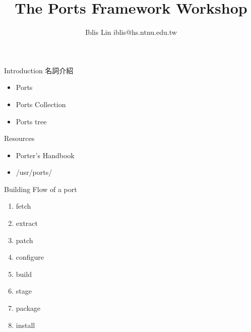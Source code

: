 \documentclass{beamer}
\title{The Ports Framework Workshop}
\author{Iblis Lin \textlangle{}iblis@hs.ntnu.edu.tw\textrangle{}}
\begin{document}
\begin{frame}
  \titlepage
\end{frame}

\begin{frame}[t]{Introduction}
  名詞介紹
  \begin{itemize}
    \item Ports
    \item Ports Collection
    \item Ports tree
  \end{itemize}
\end{frame}

\begin{frame}[t]{Resources}
  \begin{itemize}
    \item Porter's Handbook
    \item /usr/ports/
  \end{itemize}
\end{frame}

\begin{frame}[t]{Building Flow of a port}
  \begin{enumerate}
    \item fetch
    \item extract
    \item patch
    \item configure
    \item build
    \item stage
    \item package
    \item install
  \end{enumerate}
\end{frame}
\end{document}
